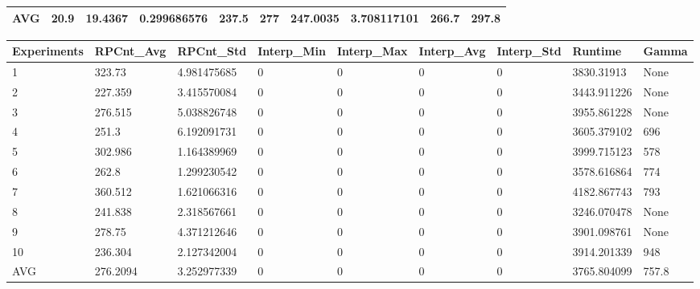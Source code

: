 \begin{table}[H]
\begin{adjustbox}{max width=360pt,keepaspectratio,angle=90}
\begin{tabular}{|l|l|l|l|l|l|l|l|l|l|}
					AVG         & 20.9         & 19.4367      & 0.299686576  & 237.5      & 277        & 247.0035   & 3.708117101 & 266.7      & 297.8      \\ \hline
				\end{tabular}
			\end{adjustbox}
			\begin{adjustbox}{max width=300pt,keepaspectratio,angle=90}
				\begin{tabular}{|l|l|l|l|l|l|l|l|l|}
					\hline
					\rowcolor[HTML]{EFEFEF} 
					Experiments & RPCnt\_Avg & RPCnt\_Std  & Interp\_Min & Interp\_Max & Interp\_Avg & Interp\_Std & Runtime     & Gamma \\ \hline
					1           & 323.73     & 4.981475685 & 0           & 0           & 0           & 0           & 3830.31913  & None  \\ \hline
					2           & 227.359    & 3.415570084 & 0           & 0           & 0           & 0           & 3443.911226 & None  \\ \hline
					3           & 276.515    & 5.038826748 & 0           & 0           & 0           & 0           & 3955.861228 & None  \\ \hline
					4           & 251.3      & 6.192091731 & 0           & 0           & 0           & 0           & 3605.379102 & 696   \\ \hline
					5           & 302.986    & 1.164389969 & 0           & 0           & 0           & 0           & 3999.715123 & 578   \\ \hline
					6           & 262.8      & 1.299230542 & 0           & 0           & 0           & 0           & 3578.616864 & 774   \\ \hline
					7           & 360.512    & 1.621066316 & 0           & 0           & 0           & 0           & 4182.867743 & 793   \\ \hline
					8           & 241.838    & 2.318567661 & 0           & 0           & 0           & 0           & 3246.070478 & None  \\ \hline
					9           & 278.75     & 4.371212646 & 0           & 0           & 0           & 0           & 3901.098761 & None  \\ \hline
					10          & 236.304    & 2.127342004 & 0           & 0           & 0           & 0           & 3914.201339 & 948   \\ \hline
					AVG         & 276.2094   & 3.252977339 & 0           & 0           & 0           & 0           & 3765.804099 & 757.8 \\ \hline
				\end{tabular}
			\end{adjustbox}	
		\end{table}
